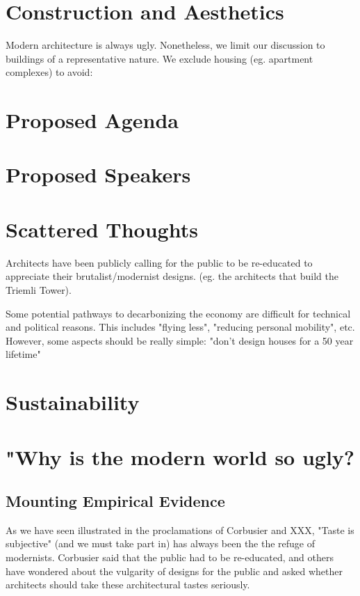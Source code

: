 \documentclass{article}
\begin{document}
\section{Construction and Aesthetics}

Modern architecture is always ugly. Nonetheless, we limit our discussion to buildings of a representative nature. We exclude housing (eg. apartment complexes) to avoid:

\section{Proposed Agenda}

\section{Proposed Speakers}

\section{Scattered Thoughts}

Architects have been publicly calling for the public to be re-educated to appreciate their brutalist/modernist designs. (eg. the architects that build the Triemli Tower).

Some potential pathways to decarbonizing the economy are difficult for technical and political reasons. This includes "flying less", "reducing personal mobility", etc.
However, some aspects should be really simple: "don't design houses for a 50 year lifetime"

\section{Sustainability}


\clearpage
\section{"Why is the modern world so ugly?}

\subsection{Mounting Empirical Evidence}

As we have seen illustrated in the proclamations of Corbusier and XXX, "Taste is subjective" (and we must take part in) has always been the the refuge of modernists. Corbusier said that the public had to be re-educated, and others have wondered about the vulgarity of designs for the public and asked whether architects should take these architectural tastes seriously.
\end{document}
